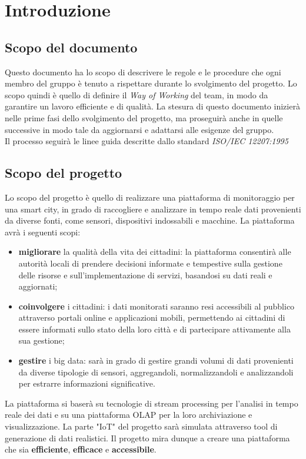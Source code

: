 \section{Introduzione}
\subsection{Scopo del documento}
Questo documento ha lo scopo di descrivere le regole e le procedure che ogni membro del gruppo è tenuto a rispettare durante lo svolgimento del progetto. Lo scopo quindi è quello di definire il \textit{Way of Working} del team, in modo da garantire un lavoro efficiente e di qualità. La stesura di questo documento inizierà nelle prime fasi dello svolgimento del progetto, ma proseguirà anche in quelle successive in modo tale da aggiornarsi e adattarsi alle esigenze del gruppo.\\ 
Il processo seguirà le linee guida descritte dallo standard \textit{ISO/IEC 12207:1995}

\subsection{Scopo del progetto}
Lo scopo del progetto è quello di realizzare una piattaforma di monitoraggio per una smart city, in grado di raccogliere e analizzare in tempo reale dati provenienti da diverse fonti, come sensori, dispositivi indossabili e macchine. La piattaforma avrà i seguenti scopi:
\begin{itemize}
    \item \textbf{migliorare} la qualità della vita dei cittadini: la piattaforma consentirà alle autorità locali di prendere decisioni informate e tempestive sulla gestione delle risorse e sull'implementazione di servizi, basandosi su dati reali e aggiornati;
    \item \textbf{coinvolgere} i cittadini: i dati monitorati saranno resi accessibili al pubblico attraverso portali online e applicazioni mobili, permettendo ai cittadini di essere informati sullo stato della loro città e di partecipare attivamente alla sua gestione;
    \item \textbf{gestire} i big data: sarà in grado di gestire grandi volumi di dati provenienti da diverse tipologie di sensori, aggregandoli, normalizzandoli e analizzandoli per estrarre informazioni significative.
\end{itemize}
La piattaforma si baserà su tecnologie di stream processing per l'analisi in tempo reale dei dati e su una piattaforma OLAP per la loro archiviazione e visualizzazione. La parte "IoT" del progetto sarà simulata attraverso tool di generazione di dati realistici.
Il progetto mira dunque a creare una piattaforma che sia \textbf{efficiente}, \textbf{efficace} e \textbf{accessibile}.


